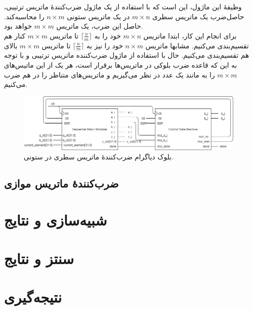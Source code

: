 \documentclass[conference]{IEEEtran-ModifiedForMVIP}
\begin{document}
وظیفهٔ این ماژول، این است که با استفاده از یک ماژول ضرب‌کنندهٔ ماتریس ترتیبی، حاصل‌ضرب یک ماتریس سطری
$m \times n$
در یک ماتریس ستونی
$n \times m$
را محاسبه‌کند.
حاصل این ضرب، یک ماتریس
$m \times m$
خواهد بود.
\\
برای انجام این‌ کار، ابتدا ماتریس 
$m \times n$
خود را به 
${\lceil\frac{n}{m}\rceil}$
تا ماتریس 
$m \times m$
کنار هم تقسیم‌بندی می‌کنیم.
مشابها ماتریس 
$n \times m$
خود را نیز به 
$\lceil\frac{n}{m}\rceil$
تا ماتریس 
$m \times m$
بالای هم تقسیم‌بندی می‌کنیم.
حال با استفاده از ماژول ضرب‌کننده ماتریس ترتیبی و با توجه به  این که قاعده ضرب بلوکی در ماتریس‌ها برقرار است، هر یک از این ماتیس‌های 
$m \times m$
را به مانند یک عدد در نظر می‌گیریم و ماتریس‌های متناظر را در هم ضرب می‌کنیم.

\begin{figure}[t]
\centering 
\includegraphics[width=1\linewidth]{Images/RowColBD.png}
\caption{
\centering
بلوک دیاگرام ضرب‌کنندهٔ ماتریس سطری در ستونی.
}\label{fig:SequentialBD}
\end{figure}


\subsection{
    ضرب‌کنندهٔ ماتریس موازی
}

\section{شبیه‌سازی و نتایج}

\section{سنتز و نتایج}

\section{نتیجه‌گیری}
\end{document}
